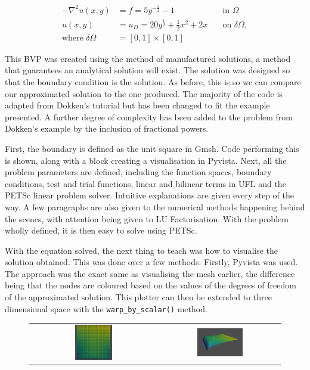 \begin{align}
-\nabla^2 u(x,y) &= f = 5y^{-\frac32} - 1 \quad &\text{in } \Omega \\
 u(x,y) &= u_D = 20y^\frac12 + \frac12 x^2 + 2x \quad &\text{on } \delta\Omega, \\
 \text{where } \delta\Omega &= [0,1] \times [0,1]
\end{align}

This BVP was created using the method of manufactured solutions, a method that guarantees an analytical solution will exist. The solution was designed so that the boundary condition is the solution. As before, this is so we can compare our approximated solution to the one produced. The majority of the code is adapted from Dokken's tutorial but has been changed to fit the example presented. A further degree of complexity has been added to the problem from Dokken's example by the inclusion of fractional powers.

First, the boundary is defined as the unit square in Gmsh. Code performing this is shown, along with a block creating a visualisation in Pyvista. Next, all the problem parameters are defined, including the function spaces, boundary conditions, test and trial functions, linear and bilinear terms in UFL and the PETSc linear problem solver. Intuitive explanations are given every step of the way. A few paragraphs are also given to the numerical methods happening behind the scenes, with attention being given to LU Factorisation. With the problem wholly defined, it is then easy to solve using PETSc.

With the equation solved, the next thing to teach was how to visualise the solution obtained. This was done over a few methods. Firstly, Pyvista was used. The approach was the exact same as visualising the mesh earlier, the difference being that the nodes are coloured based on the values of the degrees of freedom of the approximated solution. This plotter can then be extended to three dimensional space with the \texttt{warp\_by\_scalar()} method.

\begin{figure}[H]
\centering
\begin{tabular}{cc}
\includegraphics[width=0.3\textwidth, frame]{./images/notebook3/1} &   \includegraphics[width=0.4\textwidth, frame]{./images/notebook3/2} 
\end{tabular}
\end{figure}

